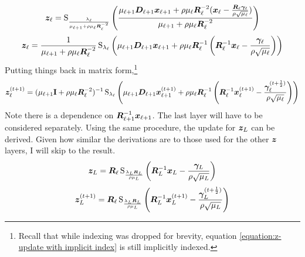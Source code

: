 %
\begin{equation}
\bm{z}_{\ell} = \operatorname{S}_{\frac{\lambda_{\ell}}{\mu_{\ell + 1} + \rho\mu_{\ell}\bm{R}_{\ell}^{-2}}}\left(\frac{\mu_{\ell + 1}\bm{D}_{\ell + 1}\bm{x}_{\ell + 1} + \rho\mu_{\ell}\bm{R}_{\ell}^{-2}(\bm{x}_{\ell} - \frac{\bm{R}_{\ell}\bm{\gamma}_{\ell}}{\rho\sqrt{\mu_{\ell}}})}{\mu_{\ell + 1} + \rho\mu_{\ell}\bm{R}_{\ell}^{-2}}\right)
\end{equation}
%
\begin{equation} \label{equation:z-update with implicit index}
\bm{z}_{\ell} = \frac{1}{\mu_{\ell + 1} + \rho\mu_{\ell}\bm{R}_{\ell}^{-2}}\operatorname{S}_{\lambda_{\ell}}\left(\mu_{\ell + 1}\bm{D}_{\ell + 1}\bm{x}_{\ell + 1} + \rho\mu_{\ell}\bm{R}_{\ell}^{-1}\left(\bm{R}_{\ell}^{-1}\bm{x}_{\ell} - \frac{\bm{\gamma}_{\ell}}{\rho\sqrt{\mu_{\ell}}}\right)\right)
\end{equation}
%
Putting things back in matrix form,\footnote{Recall that while indexing was dropped for brevity, equation \ref{equation:z-update with implicit index} is still implicitly indexed.}
%
\begin{equation}
\bm{z}_{\ell}^{(t + 1)} = (\mu_{\ell + 1}{\bf I} + \rho\mu_{\ell}\bm{R}_{\ell}^{-2})^{-1}\operatorname{S}_{\lambda_{\ell}}\left(\mu_{\ell + 1}\bm{D}_{\ell + 1}\bm{x}_{\ell + 1}^{(t + 1)} + \rho\mu_{\ell}\bm{R}_{\ell}^{-1}\left(\bm{R}_{\ell}^{-1}\bm{x}_{\ell}^{(t + 1)} - \frac{\bm{\gamma}_{\ell}^{(t + \frac{1}{2})}}{\rho\sqrt{\mu_{\ell}}}\right)\right)
\end{equation}
%
Note there is a dependence on $\bm{R}_{\ell + 1}^{-1}\bm{x}_{\ell + 1}$. The last layer will have to be considered separately. Using the same procedure, the update for $\bm{z}_L$ can be derived. Given how similar the derivations are to those used for the other $\bm{z}$ layers, I will skip to the result.
%
%
\begin{equation}
\bm{z}_L = \bm{R}_{\ell}\operatorname{S}_{\frac{\lambda_L\bm{R}_L}{\rho\mu_L}}\left(\bm{R}_L^{-1}\bm{x}_L - \frac{\bm{\gamma}_L}{\rho\sqrt{\mu_L}}\right)
\end{equation}
%
\begin{equation}
\bm{z}_L^{(t + 1)} = \bm{R}_{\ell}\operatorname{S}_{\frac{\lambda_L\bm{R}_L}{\rho\mu_L}}\left(\bm{R}_L^{-1}\bm{x}_L^{(t + 1)} - \frac{\bm{\gamma}_L^{(t + \frac{1}{2})}}{\rho\sqrt{\mu_L}}\right)
\end{equation}

